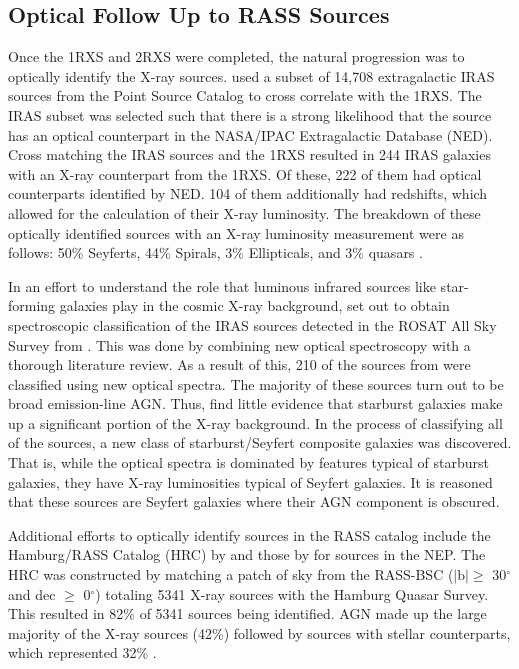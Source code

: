 \subsection{Optical Follow Up to RASS Sources}

Once the 1RXS and 2RXS were completed, the natural progression was to optically identify the X-ray sources.
\cite{boller1992} used a subset of 14,708 extragalactic IRAS sources from the Point Source Catalog to cross correlate with the 1RXS. 
The IRAS subset was selected such that there is a strong likelihood that the source has an optical counterpart in the NASA/IPAC Extragalactic Database (NED).
Cross matching the IRAS sources and the 1RXS resulted in 244 IRAS galaxies with an X-ray counterpart from the 1RXS. 
Of these, 222 of them had optical counterparts identified by NED. 
104 of them additionally had redshifts, which allowed for the calculation of their X-ray luminosity.
The breakdown of these optically identified sources with an X-ray luminosity measurement were as follows: 50\% Seyferts, 44\% Spirals, 3\% Ellipticals, and 3\% quasars \citep{boller1992}.

In an effort to understand the role that luminous infrared sources like star-forming galaxies play in the cosmic X-ray background, \cite{moran1996} set out to obtain spectroscopic classification of the IRAS sources detected in the ROSAT All Sky Survey from \cite{boller1992}.
This was done by combining new optical spectroscopy with a thorough literature review. 
As a result of this, 210 of the sources from \cite{boller1992} were classified using new optical spectra. 
The majority of these sources turn out to be broad emission-line AGN. 
Thus, \cite{moran1996} find little evidence that starburst galaxies make up a significant portion of the X-ray background. 
In the process of classifying all of the sources, a new class of starburst/Seyfert composite galaxies was discovered. 
That is, while the optical spectra is dominated by features typical of starburst galaxies, they have X-ray luminosities typical of Seyfert galaxies. 
It is reasoned that these sources are Seyfert galaxies where their AGN component is obscured.

Additional efforts to optically identify sources in the RASS catalog include the Hamburg/RASS Catalog (HRC) by \cite{zickgraf2003} and those by \cite{gioia2003} for sources in the NEP.
The HRC was constructed by matching a patch of sky from the RASS-BSC ($\left|\text{b}\right| \geq$ 30$^{\circ}$ and dec $\geq$ 0$^{\circ}$) totaling 5341 X-ray sources with the Hamburg Quasar Survey.
This resulted in 82\% of 5341 sources being identified. AGN made up the large majority of the X-ray sources (42\%) followed by sources with stellar counterparts, which represented 32\% \citep{zickgraf2003}. 


